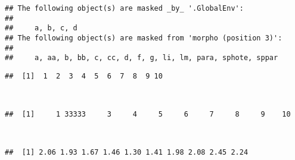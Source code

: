 \begin{knitrout}
\color{fgcolor}\begin{kframe}
\begin{flushleft}
\ttfamily\noindent
{}\hlkeyword{(}\hlkeyword{)}\mbox{}
\normalfont
\end{flushleft}
\begin{verbatim}
## The following object(s) are masked _by_ '.GlobalEnv':
## 
##     a, b, c, d
## The following object(s) are masked from 'morpho (position 3)':
## 
##     a, aa, b, bb, c, cc, d, f, g, li, lm, para, sphote, sppar
\end{verbatim}
\begin{flushleft}
\ttfamily\noindent
{}\hlkeyword{[}\hlkeyword{(}\hlkeyword{:}\hlkeyword{)}\hlkeyword{]}\mbox{}
\normalfont
\end{flushleft}
\begin{verbatim}
##  [1]  1  2  3  4  5  6  7  8  9 10
\end{verbatim}
\begin{flushleft}
\ttfamily\noindent
{}\hlkeyword{[}\hlkeyword{]}{\ }\hlassignement{\usebox{\hlnormalsizeboxlessthan}-}{\ }\hspace*{\fill}\\
\hlstd{}\hlkeyword{[}\hlkeyword{(}\hlkeyword{:}\hlkeyword{)}\hlkeyword{]}\mbox{}
\normalfont
\end{flushleft}
\begin{verbatim}
##  [1]     1 33333     3     4     5     6     7     8     9    10
\end{verbatim}
\begin{flushleft}
\ttfamily\noindent
{}\hlkeyword{(}\hlkeyword{)}\hspace*{\fill}\\
\hlstd{}\hlkeyword{\usebox{\hlnormalsizeboxdollar}}\hlkeyword{[}\hlkeyword{(}\hlkeyword{:}\hlkeyword{)}\hlkeyword{]}\mbox{}
\normalfont
\end{flushleft}
\begin{verbatim}
##  [1] 2.06 1.93 1.67 1.46 1.30 1.41 1.98 2.08 2.45 2.24
\end{verbatim}
\end{kframe}
\end{knitrout}


